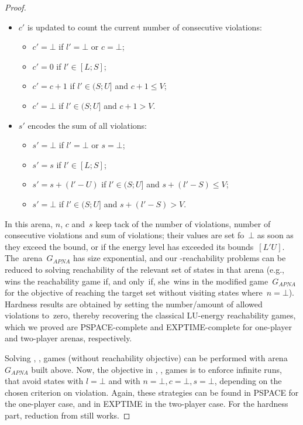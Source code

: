 \begin{proof}
\begin{itemize}
\begin{itemize}
    \end{itemize}
  \item $c'$ is updated to count the current number of consecutive violations:
    \begin{itemize}
    \item $c'=\bot$ if $l'=\bot$ or $c=\bot$;
    \item $c'=0$ if $l'\in [L;S]$;
    \item $c'=c+1$ if $l'\in(S;U]$ and $c+1\leq V$;
    \item $c'=\bot$ if $l'\in(S;U]$ and $c+1>V$.
    \end{itemize}
  \item $s'$ encodes the sum of all violations:
    \begin{itemize}
    \item $s'=\bot$ if $l'=\bot$ or $s=\bot$;
    \item $s'=s$ if $l'\in [L;S]$;
    \item $s'=s+(l'-U)$ if $l'\in(S;U]$ and $s+(l'-S)\leq V$;
    \item $s'=\bot$ if $l'\in(S;U]$ and $s+(l'-S)>V$.
    \end{itemize}
  \end{itemize}
  In this arena, $n$, $c$ and~$s$ keep tack of the number of
  violations, number of consecutive violations and sum of violations;
  their values are set fo~$\bot$ as soon as they exceed the bound, or
  if the energy level has exceeded its
  bounds~$[L'U]$. The~arena~$G_{APNA}$ has size exponential, and our
  \LVenergyall-reachability problems can be reduced to solving
  reachability of the relevant set of states in that arena (e.g., 
  wins the \APNAenergynb reachability game if, and only~if, she~wins in
  the modified game~$G_{APNA}$ for the objective of reaching the target
  set without visiting states where~$n=\bot$).
\vskip 0.5cm  
  Hardness results are obtained by setting the number\slash amount of
  allowed violations to~zero, thereby recovering the classical
  LU-energy reachability games, which we proved are PSPACE-complete
  and EXPTIME-complete for one-player and two-player arenas,
  respectively.  

Solving \LVenergynb, \LVenergyconsnb, \LVenergysum games (without reachability objective) can be
performed with arena $G_{APNA}$ built above. Now, the objective in \LVenergynb, \LVenergyconsnb, \LVenergysum games is to enforce infinite runs, that avoid states with $l=\bot$ and with $n=\bot,c=\bot,s=\bot$, depending on the chosen criterion on violation. Again, these strategies can be found in PSPACE for the one-player case, and in EXPTIME in the two-player case. For the hardness part, reduction from \LUenergy still works. 
\end{proof}
